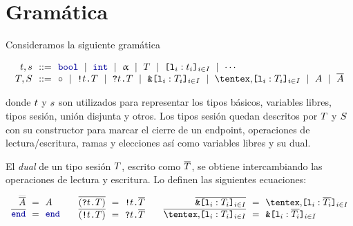 \section{Gramática}

Consideramos la siguiente gramática

\[
\begin{array}{@{}r@{~~}c@{~~}l@{}}
\TypeT, \TypeS & ::= &
\tbool
\rulemid \tint
\rulemid \tvar
\rulemid \SessionType
\rulemid \set[i\in I]{ \Tag_i : \Type_i }
\rulemid \cdots
\\
\SessionTypeT, \SessionTypeS & ::= &
\tend
\rulemid \Out\Type\SessionType
\rulemid \In\Type\SessionType
\rulemid \Branch \set[i\in I]{\Tag_i : \SessionType_i}
\rulemid \Choice \set[i\in I]{\Tag_i : \SessionType_i}
\rulemid \etvar
\rulemid \dual\etvar
\end{array}
\]

donde $t$ y $s$ son utilizados para representar los tipos básicos,
variables libres, tipos sesión, unión disjunta y otros.
Los tipos sesión quedan descritos por $T$ y $S$ con su
constructor para marcar el cierre de un endpoint, operaciones de
lectura/escritura, ramas y elecciones así como variables libres y su dual.

El \emph{dual} de un tipo sesión $T$, escrito como
$\overline{T}$, se obtiene intercambiando las operaciones de lectura y
escritura. Lo definen las siguientes ecuaciones:

\[
\begin{array}{c}
  \begin{array}{@{}r@{~~}c@{~~}l@{}}
    \smash{\dual{\dual\etvar}} & = & \etvar \\
    \dual\End & = & \End \\
  \end{array}
  \qquad
  \begin{array}{@{}r@{~~}c@{~~}l@{}}
    \dual{(\In\Type\SessionType)} & = & \Out\Type\dual\SessionType \\
    \dual{(\Out\Type\SessionType)} & = & \In\Type\dual\SessionType \\
  \end{array}
  \qquad
  \begin{array}{@{}r@{~~}c@{~~}l@{}}
    \dual{\Branch \set[i\in I]{\Tag_i : \SessionType_i}}
    & = & \Choice \set[i\in I]{\Tag_i : \dual{\SessionType_i}} \\
    \dual{\Choice \set[i\in I]{\Tag_i : \SessionType_i}}
    & = & \Branch \set[i\in I]{\Tag_i : \dual{\SessionType_i}} \\
  \end{array}
\end{array}
\]

